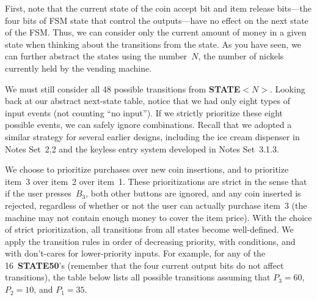 First, note that the current state of the coin accept bit and item
release bits---the four bits of FSM state that control the outputs---have
no effect on the next state of the FSM.  Thus, we can consider only the
current amount of money in a given state when thinking about the 
transitions from the state.  As you have seen, we can further abstract
the states using the number~$N$, the number of nickels currently held by 
the vending machine.

We must still consider all 48 possible transitions from {\bf STATE${<}N{>}$}.
Looking back at our abstract next-state table, notice that we had only
eight types of input events (not counting ``no input'').  If we
strictly prioritize these eight possible events, we can safely ignore
combinations.  Recall that we adopted a similar strategy for several 
earlier designs, including the ice cream dispenser in Notes Set~2.2 and
the keyless entry system developed in Notes Set~3.1.3.

We choose to prioritize purchases over new coin insertions, and to 
prioritize item~3 over item~2 over item~1.  These prioritizations
are strict in the sense that if the user presses~$B_3$, both other
buttons are ignored, and any coin inserted is rejected, regardless of
whether or not the user can actually purchase item~3 (the machine
may not contain enough money to cover the item price).
%
With the choice of strict prioritization, all transitions from all
states become well-defined.  We apply the transition rules in order of
decreasing priority,
with conditions, and with \mbox{don't-cares} for lower-priority inputs. 
For example, for any of the 16~{\bf STATE50}'s (remember that the four
current output bits do not affect transitions), the table below lists all
possible transitions assuming that $P_3=60$, $P_2=10$, and $P_1=35$.\\


